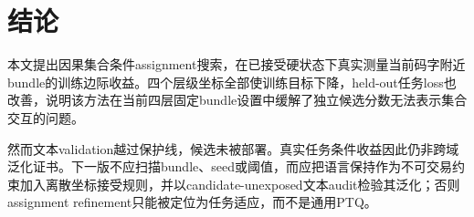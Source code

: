 \section{结论}

本文提出因果集合条件assignment搜索，在已接受硬状态下真实测量当前码字附近bundle的训练边际收益。四个层级坐标全部使训练目标下降，held-out任务loss也改善，说明该方法在当前四层固定bundle设置中缓解了独立候选分数无法表示集合交互的问题。

然而文本validation越过保护线，候选未被部署。真实任务条件收益因此仍非跨域泛化证书。下一版不应扫描bundle、seed或阈值，而应把语言保持作为不可交易约束加入离散坐标接受规则，并以candidate-unexposed文本audit检验其泛化；否则assignment refinement只能被定位为任务适应，而不是通用PTQ。
